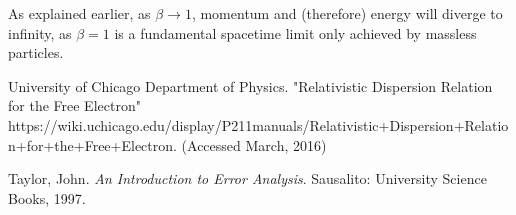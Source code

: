 \documentclass{article}
\begin{document}
As explained earlier, as $\beta \rightarrow 1$, momentum and (therefore) energy will diverge to infinity, as $\beta = 1$ is a fundamental spacetime limit only achieved by massless particles.


\begin{thebibliography}{10}

		University of Chicago Department of Physics. "Relativistic Dispersion Relation for the Free Electron"\\
		https://wiki.uchicago.edu/display/P211manuals/Relativistic+Dispersion+Relation+for+the+Free+Electron. (Accessed March, 2016)

		Taylor, John. \emph{An Introduction to Error Analysis}. Sausalito: University Science Books, 1997.
		
\end{thebibliography}
\end{document}

